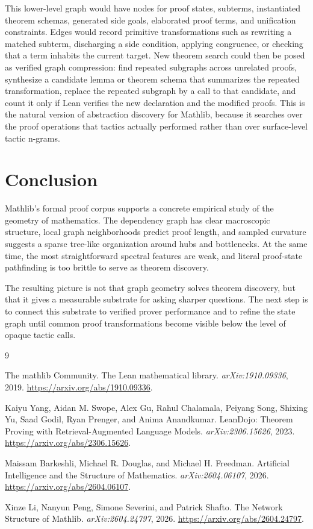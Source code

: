 \documentclass[11pt]{article}
\begin{document}
This lower-level graph would have nodes for proof states, subterms,
instantiated theorem schemas, generated side goals, elaborated proof terms, and
unification constraints. Edges would record primitive transformations such as
rewriting a matched subterm, discharging a side condition, applying congruence,
or checking that a term inhabits the current target. New theorem search could
then be posed as verified graph compression: find repeated subgraphs across
unrelated proofs, synthesize a candidate lemma or theorem schema that
summarizes the repeated transformation, replace the repeated subgraph by a call
to that candidate, and count it only if Lean verifies the new declaration and
the modified proofs. This is the natural version of abstraction discovery for
Mathlib, because it searches over the proof operations that tactics actually
performed rather than over surface-level tactic n-grams.

\section{Conclusion}

Mathlib's formal proof corpus supports a concrete empirical study of the
geometry of mathematics. The dependency graph has clear macroscopic structure,
local graph neighborhoods predict proof length, and sampled curvature suggests
a sparse tree-like organization around hubs and bottlenecks. At the same time,
the most straightforward spectral features are weak, and literal proof-state
pathfinding is too brittle to serve as theorem discovery.

The resulting picture is not that graph geometry solves theorem discovery, but
that it gives a measurable substrate for asking sharper questions. The next
step is to connect this substrate to verified prover performance and to refine
the state graph until common proof transformations become visible below the
level of opaque tactic calls.

\begin{thebibliography}{9}

The mathlib Community.
\newblock The Lean mathematical library.
\newblock \emph{arXiv:1910.09336}, 2019.
\newblock \url{https://arxiv.org/abs/1910.09336}.

Kaiyu Yang, Aidan M. Swope, Alex Gu, Rahul Chalamala, Peiyang Song,
Shixing Yu, Saad Godil, Ryan Prenger, and Anima Anandkumar.
\newblock LeanDojo: Theorem Proving with Retrieval-Augmented Language Models.
\newblock \emph{arXiv:2306.15626}, 2023.
\newblock \url{https://arxiv.org/abs/2306.15626}.

Maissam Barkeshli, Michael R. Douglas, and Michael H. Freedman.
\newblock Artificial Intelligence and the Structure of Mathematics.
\newblock \emph{arXiv:2604.06107}, 2026.
\newblock \url{https://arxiv.org/abs/2604.06107}.

Xinze Li, Nanyun Peng, Simone Severini, and Patrick Shafto.
\newblock The Network Structure of Mathlib.
\newblock \emph{arXiv:2604.24797}, 2026.
\newblock \url{https://arxiv.org/abs/2604.24797}.

\end{thebibliography}
\end{document}
